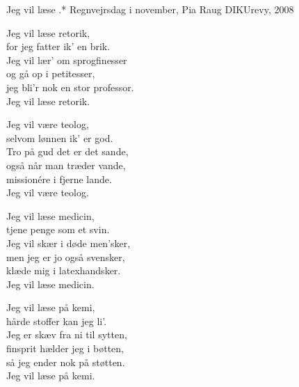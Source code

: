 \begin{song}{Jeg vil læse .*}
  {} %
  {Regnvejrsdag i november, Pia Raug} %
  {} %
  {DIKUrevy, 2008} %
  {\NotCCLIed} %

  \begin{SBVerse}
    Jeg vil læse retorik,\\
    for jeg fatter ik' en brik.\\
    Jeg vil lær' om sprogfinesser\\
    og gå op i petitesser,\\
    jeg bli'r nok en stor professor.\\
    Jeg vil læse retorik.
  \end{SBVerse}

  \begin{SBVerse}
    Jeg vil være teolog,\\
    selvom lønnen ik' er god.\\
    Tro på gud det er det sande,\\
    også når man træder vande,\\
    missionére i fjerne lande.\\
    Jeg vil være teolog.
  \end{SBVerse}

  \begin{SBVerse}
    Jeg vil læse medicin,\\
    tjene penge som et svin.\\
    Jeg vil skær i døde men'sker,\\
    men jeg er jo også svensker,\\
    klæde mig i latexhandsker.\\
    Jeg vil læse medicin.
  \end{SBVerse}

  \begin{SBVerse}
    Jeg vil læse på kemi,\\
    hårde stoffer kan jeg li'.\\
    Jeg er skæv fra ni til sytten,\\
    finsprit hælder jeg i bøtten,\\
    så jeg ender nok på støtten.\\
    Jeg vil læse på kemi.
  \end{SBVerse}


\end{song}
